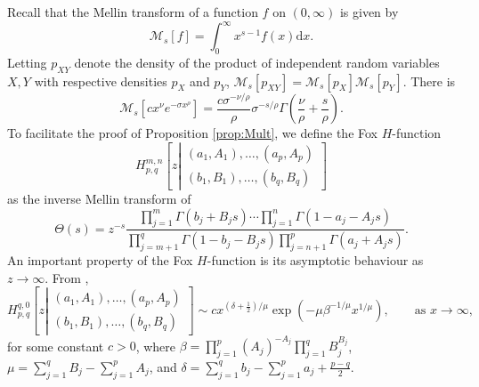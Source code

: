 \documentclass{article}
\theoremstyle{definition}
\newcommand{\dd}{\mathrm{d}}
\begin{document}
Recall that the Mellin transform of a function $f$ on $(0,\infty)$ is given by
\[
\mathcal{M}_s[f] = \int_0^\infty x^{s-1} f(x) \dd x.
\]
Letting $p_{XY}$ denote the density of the product of independent random variables $X,Y$ with respective densities $p_X$ and $p_Y$, $\mathcal{M}_s[p_{XY}] = \mathcal{M}_s[p_X] \mathcal{M}_s[p_Y]$. There is
\[
\mathcal{M}_s[c x^\nu e^{-\sigma x^\rho}] = \frac{c \sigma^{-\nu/\rho}}{\rho} \sigma^{-s/\rho} \Gamma\left(\frac{\nu}{\rho} + \frac{s}{\rho}\right).
\]
To facilitate the proof of Proposition \ref{prop:Mult}, we define the Fox $H$-function
\[
H_{p,q}^{m,n}\left[z\left|\substack{(a_{1},A_{1}),\dots,(a_{p},A_{p})\\
(b_{1},B_{1}),\dots,(b_{q},B_{q})
}
\right.\right]
\]
as the inverse Mellin transform of
\[
\Theta(s) = z^{-s} \frac{\prod_{j=1}^m \Gamma(b_j + B_j s) \cdots \prod_{j=1}^n \Gamma(1-a_j - A_j s)}{\prod_{j=m+1}^q \Gamma(1-b_j - B_j s) \prod_{j=n+1}^p \Gamma(a_j + A_j s)}.
\]
An important property of the Fox $H$-function is its asymptotic behaviour as $z \to \infty$. From \cite[Theorem 1.3]{mathai2009h},
\[
H_{p,q}^{q,0}\left[z\left|\substack{(a_{1},A_{1}),\dots,(a_{p},A_{p})\\
(b_{1},B_{1}),\dots,(b_{q},B_{q})}\right.\right] \sim c x^{(\delta+\frac12)/\mu} \exp(-\mu \beta^{-1/\mu} x^{1/\mu}),\qquad \mbox{as }x\to\infty,
\]
for some constant $c > 0$, where $\beta = \prod_{j=1}^p (A_j)^{-A_j} \prod_{j=1}^q B_j^{B_j}$, $\mu = \sum_{j=1}^q B_j - \sum_{j=1}^p A_j$, and $\delta = \sum_{j=1}^q b_j - \sum_{j=1}^p a_j + \frac{p-q}{2}$. 
\end{document}
